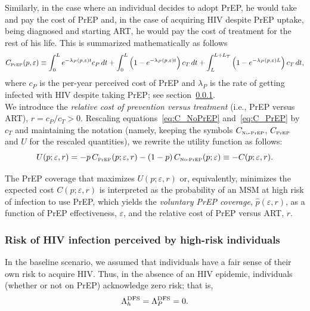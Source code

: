 \documentclass[11pt]{article}
\begin{document}
Similarly, in the case where an individual decides to adopt PrEP, he would take and pay the cost of PrEP and, in the case of acquiring HIV despite PrEP uptake, being diagnosed and starting ART, he would pay the cost of treatment for the rest of his life. This is summarized mathematically as follows
\begin{equation} \label{eq:C_PrEP}
	C_{\text{\tiny PrEP}}(p,\varepsilon) \equiv \int_ 0^{L} e^{-\lambda_P(p,\varepsilon) t} c_P \,dt + \int_ 0^{L} \left(1- e^{-\lambda_P(p,\varepsilon) t} \right) c_T \,dt + \int_L^{L+L_T} \left(1- e^{-\lambda_P(p,\varepsilon) L} \right) c_T \,dt,
\end{equation}
where $c_P$ is the per-year perceived cost of PrEP and $\lambda_P$ is the rate of getting infected with HIV despite taking PrEP; see section~\ref{sec:PerceivedRisk}. \\

We introduce the {\it relative cost of prevention versus treatment} (i.e., PrEP versus ART), $r = c_P/c_T>0$. Rescaling equations~\eqref{eq:C_NoPrEP} and~\eqref{eq:C_PrEP} by $c_T$ and maintaining the notation (namely, keeping the symbols $C_{\text{\tiny No-PrEP}}$, $C_{\text{\tiny PrEP}}$ and $U$ for the rescaled quantities), we rewrite the utility function as follows:
\begin{equation}
	U(p;\varepsilon, r) = - p \, C_{\text{\tiny PrEP}}(p;\varepsilon, r) - (1- p) \, C_{\text{\tiny No-PrEP}}(p;\varepsilon)\equiv-C(p;\varepsilon, r).
\end{equation}

The PrEP coverage that maximizes $U(p;\varepsilon, r)$ or, equivalently, minimizes the expected cost $C(p;\varepsilon, r)$ is interpreted as the probability of an MSM at high risk of infection to use PrEP, which yields the {\it voluntary PrEP coverage}, $\hat{p}(\varepsilon,r)$, as a function of PrEP effectiveness, $\varepsilon$, and the relative cost of PrEP versus ART, $r$. 


\subsubsection{Risk of HIV infection perceived by high-risk individuals} \label{sec:PerceivedRisk}

In the baseline scenario, we assumed that individuals have a fair sense of their own risk to acquire HIV. Thus, in the absence of an HIV epidemic, individuals (whether or not on PrEP) acknowledge zero risk; that is,
\begin{equation}
	\Lambda_h^{\rm DFS}=\Lambda_P^{\rm DFS}=0.
\end{equation} 
\end{document}
